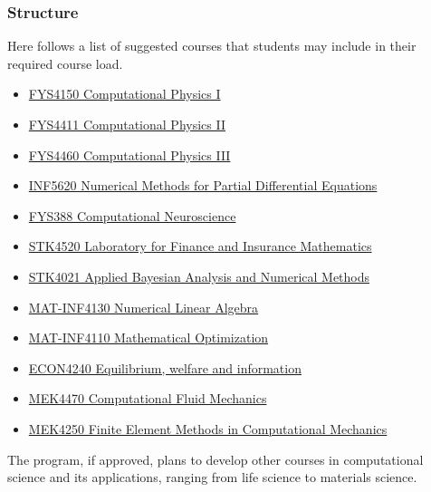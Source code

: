 \documentclass{beamer}
\begin{document}
\begin{frame}
\frametitle{Structure}

\begin{block}{}
Here follows a list of suggested courses that students may include in their required course load.
\begin{itemize}
\item \href{{http://www.uio.no/studier/emner/matnat/fys/FYS4150/index-eng.html}}{FYS4150 Computational Physics I}

\item \href{{http://www.uio.no/studier/emner/matnat/fys/FYS4411/}}{FYS4411 Computational Physics II}

\item \href{{http://www.uio.no/studier/emner/matnat/fys/FYS4460/}}{FYS4460 Computational Physics III}

\item \href{{http://www.uio.no/studier/emner/matnat/ifi/INF5620/index-eng.html}}{INF5620 Numerical Methods for Partial Differential Equations}

\item \href{{http://www.nmbu.no/course/FYS388}}{FYS388 Computational Neuroscience}

\item \href{{http://www.uio.no/studier/emner/matnat/math/STK4520/index-eng.html}}{STK4520 Laboratory for Finance and Insurance Mathematics}

\item \href{{http://www.uio.no/studier/emner/matnat/math/STK4021/index-eng.html}}{STK4021 Applied Bayesian Analysis and Numerical Methods}

\item \href{{http://www.uio.no/studier/emner/matnat/math/MAT-INF4130/index-eng.html}}{MAT-INF4130  Numerical Linear Algebra}

\item \href{{http://www.uio.no/studier/emner/matnat/math/MAT-INF4110/index.html}}{MAT-INF4110 Mathematical Optimization}

\item \href{{http://www.uio.no/studier/emner/sv/oekonomi/ECON4240/index.html}}{ECON4240 Equilibrium, welfare and information}

\item \href{{http://www.uio.no/studier/emner/matnat/math/MEK4470/index-eng.html}}{MEK4470  Computational Fluid Mechanics}

\item \href{{http://www.uio.no/studier/emner/matnat/math/MEK4250/index-eng.html}}{MEK4250 Finite Element Methods in Computational Mechanics}
\end{itemize}

\noindent
The program, if approved, plans to develop other courses in computational science and its applications, ranging from life science to materials science.
\end{block}
\end{frame}
\end{document}
